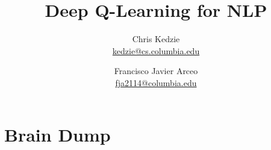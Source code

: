 \documentclass[12pt]{article}
\title{Deep Q-Learning for NLP\\ \large }
\author{
	Chris Kedzie \\ \href{mailto: kedzie@cs.columbia.edu}{\small kedzie@cs.columbia.edu} 
		\and  
	Francisco Javier Arceo \\ \href{mailto: fja2114@columbia.edu}{\small fja2114@columbia.edu} 
	}
\begin{document}
\maketitle

\begin{abstract}
\end{abstract}

\section{Brain Dump}
\end{document}
